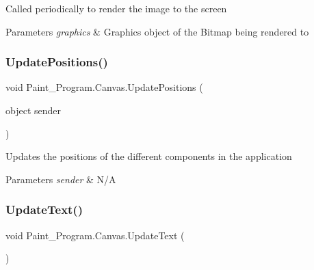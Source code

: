 Called periodically to render the image to the screen 


\begin{DoxyParams}{Parameters}
{\em graphics} & Graphics object of the Bitmap being rendered to\\
\hline
\end{DoxyParams}
\mbox{\label{class_paint___program_1_1_canvas_a472cbf23dbea24d0bd70e2267529307a}} 
\subsubsection{\texorpdfstring{Update\+Positions()}{UpdatePositions()}}
{\footnotesize\ttfamily void Paint\+\_\+\+Program.\+Canvas.\+Update\+Positions (\begin{DoxyParamCaption}\item[{object}]{sender }\end{DoxyParamCaption})\hspace{0.3cm}{\ttfamily [inline]}}



Updates the positions of the different components in the application 


\begin{DoxyParams}{Parameters}
{\em sender} & N/A\\
\hline
\end{DoxyParams}
\mbox{\label{class_paint___program_1_1_canvas_ad80b3ef48814a229e01a330b49344f3b}} 
\subsubsection{\texorpdfstring{Update\+Text()}{UpdateText()}}
{\footnotesize\ttfamily void Paint\+\_\+\+Program.\+Canvas.\+Update\+Text (\begin{DoxyParamCaption}{ }\end{DoxyParamCaption})\hspace{0.3cm}{\ttfamily [inline]}}



